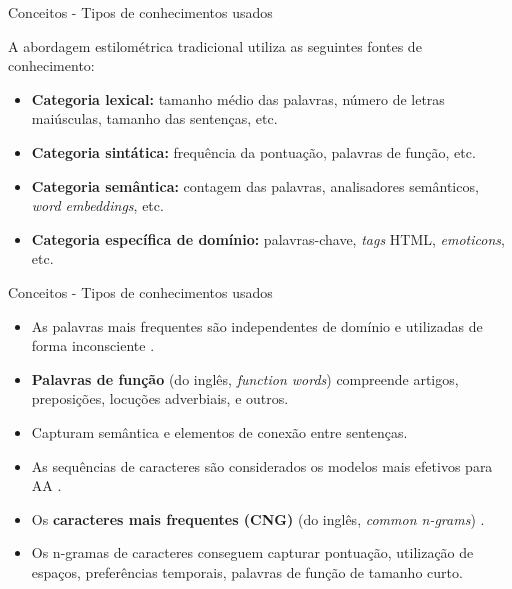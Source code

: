 \begin{frame}{Conceitos - Tipos de conhecimentos usados}

A abordagem estilométrica tradicional utiliza as seguintes fontes de conhecimento:

\begin{itemize}
	\item {\bf Categoria lexical:} tamanho médio das palavras, número de letras maiúsculas, tamanho das sentenças, etc.
	
	\item {\bf Categoria sintática:} frequência da pontuação, palavras de função, etc.
	
	\item {\bf Categoria semântica:} contagem das palavras, analisadores semânticos, {\it word embeddings}, etc. 
	
	\item {\bf Categoria específica de domínio:} palavras-chave, {\it tags} HTML, {\it emoticons}, etc.
\end{itemize}
\end{frame}

\begin{frame}{Conceitos - Tipos de conhecimentos usados}\selectFont
	\begin{tcolorbox}[colback=blue!1!white,colframe=blue!35!black,title=Palavras,height=3cm,valign=center]
		\begin{itemize}
			\item As palavras mais frequentes são independentes de domínio e utilizadas de forma inconsciente \cite{Kestemont2014}.
			\item {\bf Palavras de função} (do inglês, {\it function words}) compreende artigos, preposições, locuções adverbiais, e outros.
			\item Capturam semântica e elementos de conexão entre sentenças.			
		\end{itemize}

	\end{tcolorbox}

	\begin{tcolorbox}[colback=green!1!white,colframe=green!35!black,title=Caracteres,height=4cm,valign=center]
		\begin{itemize}
			\item As sequências de caracteres são considerados os modelos mais efetivos para AA \cite{KjellWF94,Neal2017}.
			\item Os {\bf caracteres mais frequentes (CNG)} (do inglês, {\it common n-grams}) \cite{Keselj2003,Sapkota2014}.
			\item Os n-gramas de caracteres conseguem capturar pontuação, utilização de espaços, preferências temporais, palavras de função de tamanho curto. 
		\end{itemize}

	\end{tcolorbox}
\end{frame}

